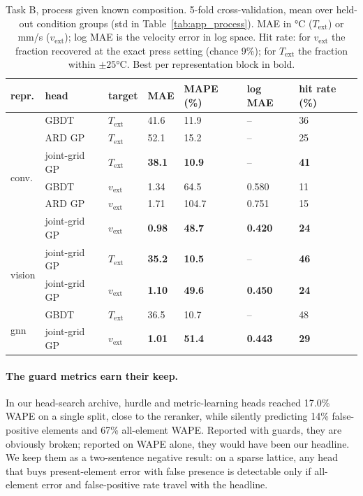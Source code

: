 \documentclass{article}
\newcommand{\Text}{T_{\mathrm{ext}}}
\newcommand{\vext}{v_{\mathrm{ext}}}
\begin{document}
\begin{table}[t]
  \caption{Task B, process given known composition. 5-fold cross-validation,
  mean over held-out condition groups (std in
  Table~\ref{tab:app_process}). MAE in °C ($\Text$) or mm/s ($\vext$); log MAE
  is the velocity error in log space. Hit rate: for $\vext$ the fraction
  recovered at the exact press setting (chance 9\%); for $\Text$ the fraction
  within $\pm 25$°C. Best per representation block in bold.}
  \label{tab:process}
  \centering\small
  \begin{tabularx}{\linewidth}{@{}lllXXXX@{}}
    \toprule
    repr. & head & target & MAE & MAPE (\%) & log MAE & hit rate (\%) \\
    \midrule
    \multirow{6}{*}{conv.}
      & GBDT & $\Text$ & 41.6 & 11.9 & -- & 36 \\
      & ARD GP & $\Text$ & 52.1 & 15.2 & -- & 25 \\
      & joint-grid GP & $\Text$ & \textbf{38.1} & \textbf{10.9} & -- & \textbf{41} \\
      \cmidrule(l){2-7}
      & GBDT & $\vext$ & 1.34 & 64.5 & 0.580 & 11 \\
      & ARD GP & $\vext$ & 1.71 & 104.7 & 0.751 & 15 \\
      & joint-grid GP & $\vext$ & \textbf{0.98} & \textbf{48.7} & \textbf{0.420} & \textbf{24} \\
    \midrule
    \multirow{2}{*}{vision}
      & joint-grid GP & $\Text$ & \textbf{35.2} & \textbf{10.5} & -- & \textbf{46} \\
      & joint-grid GP & $\vext$ & \textbf{1.10} & \textbf{49.6} & \textbf{0.450} & \textbf{24} \\
    \midrule
    \multirow{2}{*}{gnn}
      & GBDT & $\Text$ & 36.5 & 10.7 & -- & 48 \\
      & joint-grid GP & $\vext$ & \textbf{1.01} & \textbf{51.4} & \textbf{0.443} & \textbf{29} \\
    \bottomrule
  \end{tabularx}
\end{table}

\paragraph{The guard metrics earn their keep.} In our head-search archive,
hurdle and metric-learning heads reached 17.0\% WAPE on a single split, close
to the reranker, while silently predicting 14\% false-positive elements and
67\% all-element WAPE. Reported with guards, they are obviously broken;
reported on WAPE alone, they would have been our headline. We keep them as a
two-sentence negative result: on a sparse lattice, any head that buys
present-element error with false presence is detectable only if all-element
error and false-positive rate travel with the headline.
\end{document}
